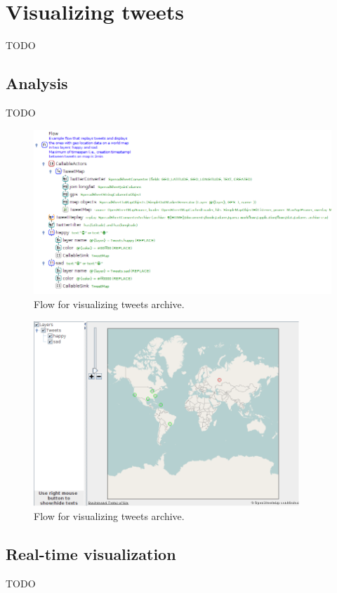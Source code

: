 \documentclass[a4paper,10pt]{book}
\begin{document}
\clearpage
\newpage
\section{Visualizing tweets}
TODO

\subsection{Analysis}
TODO

\begin{figure}[htb]
  \centering
  \includegraphics[width=12.0cm]{images/visualize_tweets-archive-flow.png}
  \caption{Flow for visualizing tweets archive.}
  \label{visualize_tweets-archive-flow}
\end{figure}

\begin{figure}[htb]
  \centering
  \includegraphics[width=10.0cm]{images/visualize_tweets-archive-output.png}
  \caption{Flow for visualizing tweets archive.}
  \label{visualize_tweets-archive-output}
\end{figure}

\subsection{Real-time visualization}
TODO
\end{document}
